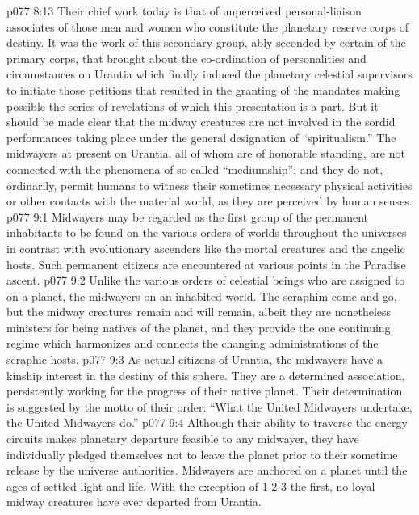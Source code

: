 \vs p077 8:13 Their chief work today is that of unperceived personal\hyp{}liaison associates of those men and women who constitute the planetary reserve corps of destiny. It was the work of this secondary group, ably seconded by certain of the primary corps, that brought about the co\hyp{}ordination of personalities and circumstances on Urantia which finally induced the planetary celestial supervisors to initiate those petitions that resulted in the granting of the mandates making possible the series of revelations of which this presentation is a part. But it should be made clear that the midway creatures are not involved in the sordid performances taking place under the general designation of “spiritualism.” The midwayers at present on Urantia, all of whom are of honorable standing, are not connected with the phenomena of so\hyp{}called “mediumship”; and they do not, ordinarily, permit humans to witness their sometimes necessary physical activities or other contacts with the material world, as they are perceived by human senses.
\vs p077 9:1 Midwayers may be regarded as the first group of the permanent inhabitants to be found on the various orders of worlds throughout the universes in contrast with evolutionary ascenders like the mortal creatures and the angelic hosts. Such permanent citizens are encountered at various points in the Paradise ascent.
\vs p077 9:2 Unlike the various orders of celestial beings who are assigned to  on a planet, the midwayers  on an inhabited world. The seraphim come and go, but the midway creatures remain and will remain, albeit they are nonetheless ministers for being natives of the planet, and they provide the one continuing regime which harmonizes and connects the changing administrations of the seraphic hosts.
\vs p077 9:3 As actual citizens of Urantia, the midwayers have a kinship interest in the destiny of this sphere. They are a determined association, persistently working for the progress of their native planet. Their determination is suggested by the motto of their order: “What the United Midwayers undertake, the United Midwayers do.”
\vs p077 9:4 Although their ability to traverse the energy circuits makes planetary departure feasible to any midwayer, they have individually pledged themselves not to leave the planet prior to their sometime release by the universe authorities. Midwayers are anchored on a planet until the ages of settled light and life. With the exception of 1\hyp{}2\hyp{}3 the first, no loyal midway creatures have ever departed from Urantia.
